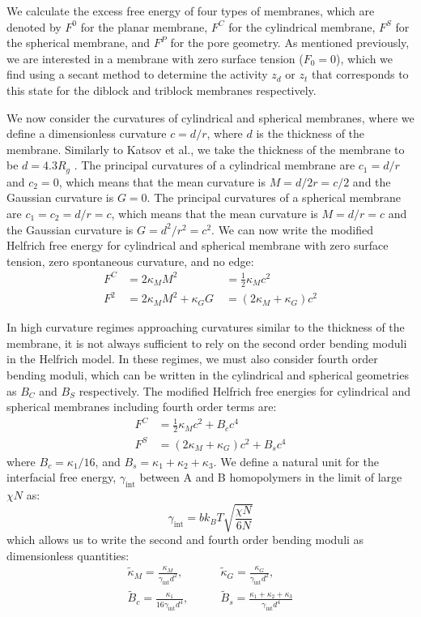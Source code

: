 \documentclass[twocolumn,aps,floatfix,nobibnotes]{revtex4-1}
\begin{document}
We calculate the excess free energy of four types of membranes, which are denoted by $F^0$ for the planar membrane, $F^C$ for the cylindrical membrane, $F^S$ for the spherical membrane, and $F^P$ for the pore geometry. As mentioned previously, we are interested in a membrane with zero surface tension ($F_0=0$), which we find using a secant method to determine the activity $z_d$ or $z_t$ that corresponds to this state for the diblock and triblock membranes respectively.  

We now consider the curvatures of cylindrical and spherical membranes, where we define a dimensionless curvature $c = d/r$, where $d$ is the thickness of the membrane. Similarly to Katsov et al., we take the thickness of the membrane to be $d = 4.3 R_g$ \cite{katsov2004field}. The principal curvatures of a cylindrical membrane are $c_1 = d/r$ and $c_2=0$, which means that the mean curvature is $M = d/2r = c/2$ and the Gaussian curvature is $G = 0$. The principal curvatures of a spherical membrane are $c_1 = c_2 = d/r = c$, which means that the mean curvature is $M = d/r = c$ and the Gaussian curvature is $G = d^2/r^2 = c^2$. We can now write the modified Helfrich free energy for cylindrical and spherical membrane with zero surface tension, zero spontaneous curvature, and no edge:
\begin{align}
F^C &= 2 \kappa_M M^2 \quad \quad \quad \quad \ = \frac{1}{2} \kappa_M c^2 \\
F^2 &= 2 \kappa_M M^2 + \kappa_G G \quad  = (2 \kappa_M + \kappa_G)c^2
\end{align}

In high curvature regimes approaching curvatures similar to the thickness of the membrane, it is not always sufficient to rely on the second order bending moduli in the Helfrich model. In these regimes, we must also consider fourth order bending moduli, which can be written in the cylindrical and spherical geometries as $B_C$ and $B_S$ respectively. The modified Helfrich free energies for cylindrical and spherical membranes including fourth order terms are:
\begin{align}
F^C &= \frac{1}{2} \kappa_M c^2 + B_c c^4 \\
F^S &=  (2 \kappa_M + \kappa_G)c^2 + B_sc^4
\end{align}
where $B_c = \kappa_1 /16$, and $B_s = \kappa_1 + \kappa_2 + \kappa_3$. We define a natural unit for the interfacial free energy, $\gamma_{\text{int}}$ between A and B homopolymers in the limit of large $\chi N$ as:
\begin{equation}
\gamma_{\text{int}} = b k_B T\sqrt{\frac{\chi N}{6N}} 
\end{equation} 
which allows us to write the second and fourth order bending moduli as dimensionless quantities:
\begin{align}
\tilde{\kappa}_M = \frac{\kappa_M}{\gamma_{\text{int}} d^2},  \quad &\quad \tilde{\kappa}_G = \frac{\kappa_G}{\gamma_{\text{int}} d^2}, \\
\tilde{B}_c = \frac{\kappa_1}{16 \gamma_{\text{int}} d^4},  \quad &\quad \tilde{B}_s = \frac{\kappa_1+\kappa_2+\kappa_3}{\gamma_{\text{int}} d^4}
\end{align}
\end{document}
